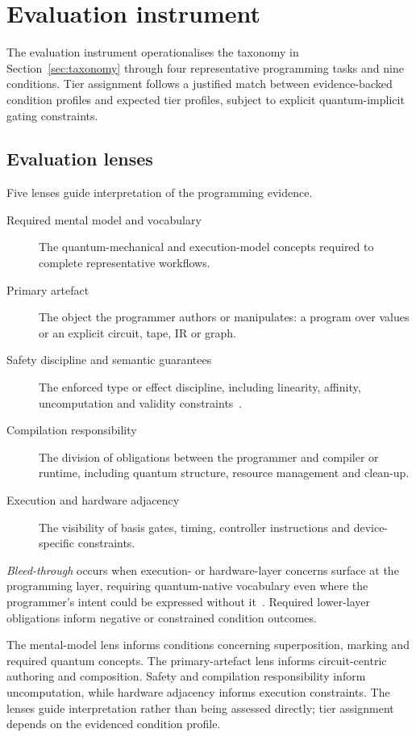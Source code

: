 \section{Evaluation instrument}\label{sec:evaluation_instrument}
The evaluation instrument operationalises the taxonomy in Section~\ref{sec:taxonomy} through four representative programming tasks and nine conditions.
Tier assignment follows a justified match between evidence-backed condition profiles and expected tier profiles, subject to explicit quantum-implicit gating constraints.

\ifthesis

\subsection{Evaluation lenses}\label{subsec:evaluation_instrument:lenses}
Five lenses guide interpretation of the programming evidence.
\begin{description}
    \item[Required mental model and vocabulary] The quantum-mechanical and execution-model concepts required to complete representative workflows.
    \item[Primary artefact] The object the programmer authors or manipulates: a program over values or an explicit circuit, tape, IR or graph.
    \item[Safety discipline and semantic guarantees] The enforced type or effect discipline, including linearity, affinity, uncomputation and validity constraints~\cite{pierce2002tapl-doc9,bichsel2020silq}.
    \item[Compilation responsibility] The division of obligations between the programmer and compiler or runtime, including quantum structure, resource management and clean-up.
    \item[Execution and hardware adjacency] The visibility of basis gates, timing, controller instructions and device-specific constraints.
\end{description}

\textit{Bleed-through} occurs when execution- or hardware-layer concerns surface at the programming layer, requiring quantum-native vocabulary even where the programmer's intent could be expressed without it~\cite{DiMatteo2024AbstractionHierarchy,nunez_corrales2025betterabstractmachines}.
Required lower-layer obligations inform negative or constrained condition outcomes.

The mental-model lens informs conditions concerning superposition, marking and required quantum concepts.
The primary-artefact lens informs circuit-centric authoring and composition.
Safety and compilation responsibility inform uncomputation, while hardware adjacency informs execution constraints.
The lenses guide interpretation rather than being assessed directly; tier assignment depends on the evidenced condition profile.
\fi

